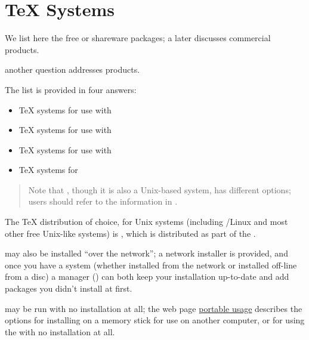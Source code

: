 
\section{\TeX{} Systems}


We list here the free or shareware packages;
\htmlignore
a later  discusses commercial \tex{} products.
\endhtmlignore
\begin{htmlversion}
  another question addresses
   products.
\end{htmlversion}

The list is provided in four answers:
\begin{itemize}
\item \TeX{} systems for use with
\item \TeX{} systems for use with %
\item \TeX{} systems for use with %
\item \TeX{} systems for %
\end{itemize}


\begin{quote}
  Note that \macosx{}, though it is also a Unix-based system, has
  different options; users should refer to the information in
  .
\end{quote}

The \TeX{} distribution of choice, for Unix systems (including
/Linux and most other free Unix-like systems) is \texlive{},
which is distributed as part of the .

\texlive{} may also be installed ``over the network''; a network
installer is provided, and once you have a system (whether installed
from the network or installed off-line from a disc) a manager
() can both keep your installation up-to-date and add
packages you didn't install at first.

\texlive{} may be run with no installation at all; the web page %
\href{http://www.tug.org/texlive/portable.html}{\texlive{} portable usage}
describes the options for installing \texlive{} on a memory stick for
use on another computer, or for using the \texlive{}  with
no installation at all.

